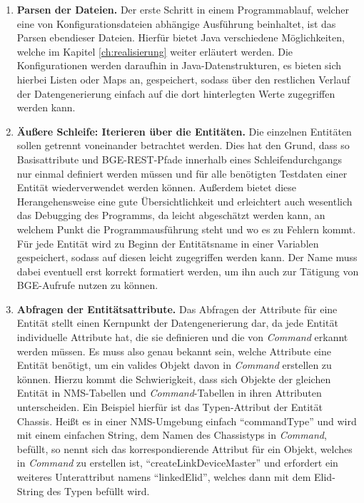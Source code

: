 \newpage
\begin{enumerate}
    \item \textbf{Parsen der Dateien.} Der erste Schritt in einem Programmablauf, welcher eine von Konfigurationsdateien abhängige Ausführung beinhaltet, ist das Parsen ebendieser Dateien. Hierfür bietet Java verschiedene Möglichkeiten, welche im Kapitel \ref{ch:realisierung} weiter erläutert werden. Die Konfigurationen werden daraufhin in Java-Datenstrukturen, es bieten sich hierbei Listen oder Maps an, gespeichert, sodass über den restlichen Verlauf der Datengenerierung einfach auf die dort hinterlegten Werte zugegriffen werden kann.
    \item \textbf{Äußere Schleife: Iterieren über die Entitäten.} Die einzelnen Entitäten sollen getrennt voneinander betrachtet werden. Dies hat den Grund, dass so Basisattribute und \ac{BGE}-\ac{REST}-Pfade innerhalb eines Schleifendurchgangs nur einmal definiert werden müssen und für alle benötigten Testdaten einer Entität wiederverwendet werden können. Außerdem bietet diese Herangehensweise eine gute Übersichtlichkeit und erleichtert auch wesentlich das Debugging des Programms, da leicht abgeschätzt werden kann, an welchem Punkt die Programmausführung steht und wo es zu Fehlern kommt. Für jede Entität wird zu Beginn der Entitätsname in einer Variablen gespeichert, sodass auf diesen leicht zugegriffen werden kann. Der Name muss dabei eventuell erst korrekt formatiert werden, um ihn auch zur Tätigung von \ac{BGE}-Aufrufe nutzen zu können.
    \item \textbf{Abfragen der Entitätsattribute.} Das Abfragen der Attribute für eine Entität stellt einen Kernpunkt der Datengenerierung dar, da jede Entität individuelle Attribute hat, die sie definieren und die von \textit{Command} erkannt werden müssen. Es muss also genau bekannt sein, welche Attribute eine Entität benötigt, um ein valides Objekt davon in \textit{Command} erstellen zu können. Hierzu kommt die Schwierigkeit, dass sich Objekte der gleichen Entität in \ac{NMS}-Tabellen und \textit{Command}-Tabellen in ihren Attributen unterscheiden. Ein Beispiel hierfür ist das Typen-Attribut der Entität Chassis. Heißt es in einer \ac{NMS}-Umgebung einfach \enquote{commandType} und wird mit einem einfachen String, dem Namen des Chassistyps in \textit{Command}, befüllt, so nennt sich das korrespondierende Attribut für ein Objekt, welches in \textit{Command} zu erstellen ist, \enquote{createLinkDeviceMaster} und erfordert ein weiteres Unterattribut namens \enquote{linkedElid}, welches dann mit dem \ac{Elid}-String des Typen befüllt wird.
    

\end{enumerate}
